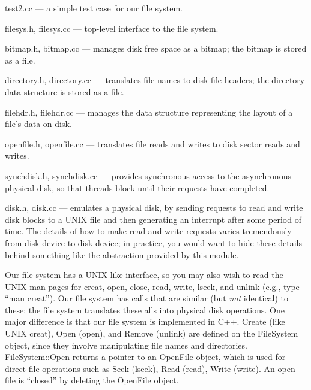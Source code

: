 \begin{description}

\item test2.cc --- a simple test case for our file system.

\item filesys.h, filesys.cc --- top-level interface to the file system.

\item bitmap.h, bitmap.cc --- manages disk free space as a bitmap;
the bitmap is stored as a file.

\item directory.h, directory.cc --- translates file names to disk file
headers; the directory data structure is stored as a file.

\item filehdr.h, filehdr.cc --- manages the data structure representing
the layout of a file's data on disk.

\item openfile.h, openfile.cc --- translates file reads and writes to
disk sector reads and writes.

\item synchdisk.h, synchdisk.cc --- provides synchronous
access to the asynchronous physical disk, so that threads block until 
their requests have completed.

\item disk.h, disk.cc --- emulates a physical disk, by sending requests 
to read and write disk blocks to a UNIX file and then generating an interrupt 
after some period of time.
The details of how to make read and write requests varies tremendously
from disk device to disk device; in practice, you would want to hide 
these details behind something like the abstraction provided by this module.

\end{description}

Our file system has a UNIX-like interface, so you may also wish to read 
the UNIX man pages for creat, open, close, read, write, lseek, and unlink
(e.g., type ``man creat'').  
Our file system has calls that are similar (but {\em not} identical) to these;
the file system translates these alls 
into physical disk operations.  One major difference is that our 
file system is implemented in C++.  Create (like UNIX creat), 
Open (open), and Remove (unlink) are defined on the FileSystem object, 
since they involve manipulating file names and directories.  
FileSystem::Open returns a pointer to an OpenFile object, 
which is used for direct file operations such as Seek (lseek), Read (read),
Write (write).  An open file is ``closed'' by deleting the OpenFile object.

